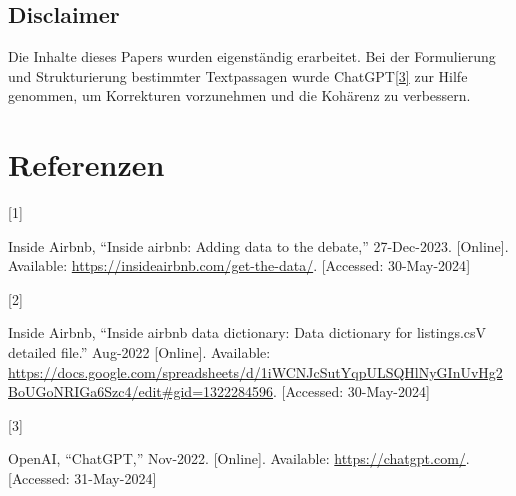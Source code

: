 \documentclass[
  journal,
]{IEEEtran}%
\newlength{\cslhangindent}
\newlength{\csllabelwidth}
\newlength{\cslentryspacingunit} %
\newenvironment{CSLReferences}[2] %
 {%
  \setlength{\parindent}{0pt}
  \ifodd #1
  \let\oldpar\par
  \def\par{\hangindent=\cslhangindent\oldpar}
  \fi
  \setlength{\parskip}{#2\cslentryspacingunit}
 }%
 {}
\newcommand{\CSLLeftMargin}[1]{\parbox[t]{\csllabelwidth}{#1}}
\newcommand{\CSLRightInline}[1]{\parbox[t]{\linewidth - \csllabelwidth}{#1}\break}
\providecommand{\bibfont}{\footnotesize}
\begin{document}
\hypertarget{disclaimer}{%
\subsection{Disclaimer}\label{disclaimer}}

Die Inhalte dieses Papers wurden eigenständig erarbeitet. Bei der
Formulierung und Strukturierung bestimmter Textpassagen wurde
ChatGPT\protect\hyperlink{ref-openai-2022}{{[}3{]}} zur Hilfe genommen,
um Korrekturen vorzunehmen und die Kohärenz zu verbessern.

\hypertarget{referenzen}{%
\section*{Referenzen}\label{referenzen}}

\hypertarget{refs}{}
\begin{CSLReferences}{0}{0}
\leavevmode{}%
\CSLLeftMargin{{[}1{]} }%
\CSLRightInline{Inside Airbnb, {``Inside airbnb: Adding data to the
debate,''} 27-Dec-2023. {[}Online{]}. Available:
\url{https://insideairbnb.com/get-the-data/}. {[}Accessed:
30-May-2024{]}}

\leavevmode{}%
\CSLLeftMargin{{[}2{]} }%
\CSLRightInline{Inside Airbnb, {``Inside airbnb data dictionary: Data
dictionary for listings.csV detailed file.''} Aug-2022 {[}Online{]}.
Available:
\url{https://docs.google.com/spreadsheets/d/1iWCNJcSutYqpULSQHlNyGInUvHg2BoUGoNRIGa6Szc4/edit\#gid=1322284596}.
{[}Accessed: 30-May-2024{]}}

\leavevmode{}%
\CSLLeftMargin{{[}3{]} }%
\CSLRightInline{OpenAI, {``ChatGPT,''} Nov-2022. {[}Online{]}.
Available: \url{https://chatgpt.com/}. {[}Accessed: 31-May-2024{]}}

\end{CSLReferences}


\ifCLASSOPTIONcaptionsoff
  \newpage
\fi



\pagebreak[3]
\end{document}
